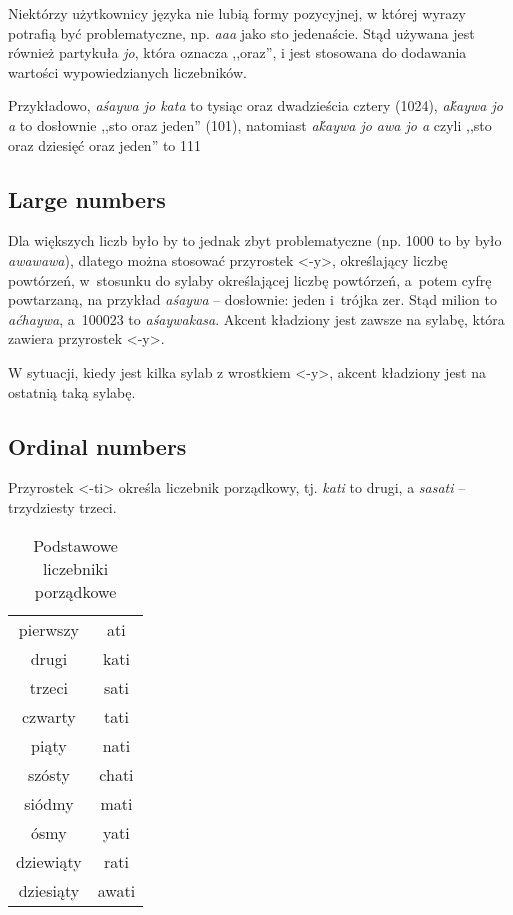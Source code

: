 Niektórzy użytkownicy języka nie lubią formy pozycyjnej, w której wyrazy
potrafią być problematyczne, np. \emph{aaa} jako sto jedenaście. Stąd używana
jest również partykuła \emph{jo}, która oznacza ,,oraz'', i jest stosowana do
dodawania wartości wypowiedzianych liczebników.

Przykładowo, \emph{aśaywa jo kata} to tysiąc oraz dwadzieścia cztery (1024),
\emph{aḱaywa jo a} to dosłownie ,,sto oraz jeden'' (101), natomiast
\emph{aḱaywa jo awa jo a} czyli ,,sto oraz dziesięć oraz jeden'' to 111


\subsection{Large numbers}

Dla większych
liczb było by to jednak zbyt problematyczne (np. 1000 to by było
\emph{awawawa}), dlatego można stosować przyrostek <-y>, określający liczbę
powtórzeń, w~stosunku do sylaby określającej liczbę powtórzeń, a~potem cyfrę
powtarzaną, na przykład \emph{aśaywa} -- dosłownie: jeden i~trójka zer. Stąd
milion to \emph{aćhaywa}, a~100023 to \emph{aśaywakasa}. Akcent kładziony jest
zawsze na sylabę, która zawiera przyrostek <-y>.

W sytuacji, kiedy jest kilka sylab z wrostkiem <-y>, akcent kładziony jest na
ostatnią taką sylabę.



\subsection{Ordinal numbers}

Przyrostek <-ti> określa liczebnik porządkowy, tj. \emph{kati} to drugi, a
\emph{sasati} -- trzydziesty trzeci.

\begin{table}[ht]
  \centering
  \caption{Podstawowe liczebniki porządkowe}
  \begin{tabular}{cc} \toprule
    pierwszy  & ati   \\
    drugi     & kati  \\
    trzeci    & sati  \\
    czwarty   & tati  \\
    piąty     & nati  \\
    szósty    & chati \\
    siódmy    & mati  \\
    ósmy      & yati  \\
    dziewiąty & rati  \\
    dziesiąty & awati \\\bottomrule
  \end{tabular}
  \label{tab:numerals3}
\end{table}

